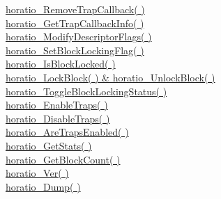 \documentclass{article}
\begin{document}
\href{#RemoveTrapCallback}{horatio\_RemoveTrapCallback( )}
\\
\href{#GetTrapCallbackInfo}{horatio\_GetTrapCallbackInfo( )}
\\
\href{#ModifyDescriptorFlags}{horatio\_ModifyDescriptorFlags( )}
\\
\href{#SetBlockLockingFlag}{horatio\_SetBlockLockingFlag( )}
\\
\href{#IsBlockLocked}{horatio\_IsBlockLocked( )}
\\
\href{#LockBlock}{horatio\_LockBlock( ) \& horatio\_UnlockBlock(
)}
\\
\href{#ToggleBlockLockingStatus}{horatio\_ToggleBlockLockingStatus(
)}
\\
\href{#EnableTraps}{horatio\_EnableTraps( )}
\\
\href{#DisableTraps}{horatio\_DisableTraps( )}
\\
\href{#AreTrapsEnabled}{horatio\_AreTrapsEnabled( )}
\\
\href{#GetStats}{horatio\_GetStats( )}
\\
\href{#GetBlockCount}{horatio\_GetBlockCount( )}
\\
\href{#Ver}{horatio\_Ver( )}
\\
\href{#Dump}{horatio\_Dump( )}
\end{document}
